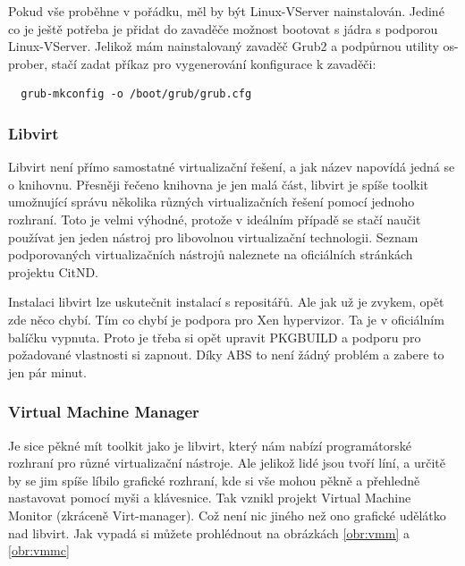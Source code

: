 Pokud vše proběhne v pořádku, měl by být Linux-VServer nainstalován. Jediné co je ještě potřeba je přidat do zavaděče možnost bootovat s jádra s podporou Linux-VServer.
Jelikož mám nainstalovaný zavaděč Grub2 a podpůrnou utility os-prober, stačí zadat příkaz pro vygenerování konfigurace k zavaděči:
\begin{verbatim}
  grub-mkconfig -o /boot/grub/grub.cfg 
\end{verbatim}
\subsubsection{Libvirt}
Libvirt není přímo samostatné virtualizační řešení, a jak název napovídá jedná se o knihovnu. Přesněji řečeno knihovna je jen malá část, libvirt je spíše toolkit umožnující správu několika různých virtualizačních řešení pomocí jednoho rozhraní. Toto je velmi výhodné, protože v ideálním případě se stačí naučit používat jen jeden nástroj pro libovolnou virtualizační technologii. Seznam podporovaných virtualizačních nástrojů naleznete na oficiálních stránkách projektu CitND.

Instalaci libvirt lze uskutečnit instalací s repositářů. Ale jak už je zvykem, opět zde něco chybí. Tím co chybí je podpora pro Xen hypervizor. Ta je v oficiálním balíčku vypnuta. Proto je třeba si opět upravit PKGBUILD a podporu pro požadované vlastnosti si zapnout. Díky ABS to není žádný problém a zabere to jen pár minut.
\subsubsection{Virtual Machine Manager}
Je sice pěkné mít toolkit jako je libvirt, který nám nabízí programátorské rozhraní pro různé virtualizační nástroje. Ale jelikož lidé jsou tvoří líní, a určitě by se jim spíše líbilo grafické rozhraní, kde si vše mohou pěkně a přehledně nastavovat pomocí myši a klávesnice. Tak vznikl projekt Virtual Machine Monitor (zkráceně Virt-manager). Což není nic jiného než ono grafické udělátko nad libvirt. Jak vypadá si můžete prohlédnout na obrázkách \ref{obr:vmm} a \ref{obr:vmmc}

